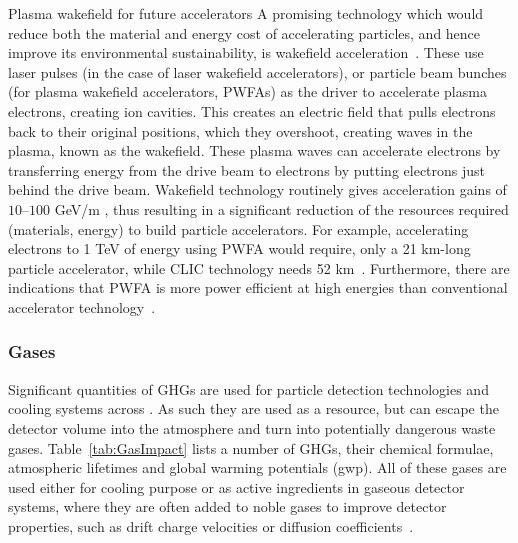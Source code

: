 \documentclass[../SustainableHEP.tex]{subfiles}
\begin{document}
\begin{casestudy}{Plasma wakefield for future accelerators}%
\noindent  A promising technology which would reduce both the material and energy cost of accelerating particles, and hence improve its environmental sustainability, is wakefield acceleration~\cite{wakefield1}.  These use laser pulses (in the case of laser wakefield accelerators), or particle beam bunches (for plasma wakefield accelerators, PWFAs) as the driver to accelerate plasma electrons, creating ion cavities.  This creates an electric field that pulls electrons back to their original positions, which they overshoot, creating waves in the plasma, known as the wakefield.  These plasma waves can accelerate electrons by transferring energy from the drive beam to electrons by putting electrons just behind the drive beam.  Wakefield technology routinely gives acceleration gains of $10$--$100$ GeV/m \cite{wakefield1}, thus resulting in a significant reduction of the resources required (materials, energy) to build particle accelerators.  For example, accelerating electrons to 1 TeV of energy using PWFA would require, \eg only a 21 km-long particle accelerator, while CLIC technology needs 52 km~\cite{wakefield2}.  Furthermore, there are indications that PWFA is more power efficient at high energies than conventional accelerator technology~\cite{wakefield2}.
\end{casestudy}

\subsubsection{Gases}

Significant quantities of GHGs are used for particle detection technologies and cooling systems across \ACR. As such they are used as a resource, but can escape the detector volume into the atmosphere and turn into potentially dangerous waste gases. Table~\ref{tab:GasImpact} lists a number of GHGs, their chemical formulae, atmospheric lifetimes and global warming potentials (\acrshort{gwp}). All of these gases are used either for cooling purpose or as active ingredients in gaseous detector systems, where they are often added to noble gases to improve detector properties, such as drift charge velocities or diffusion coefficients~\cite{Sauli:2014cyf}.
    
\end{document}
